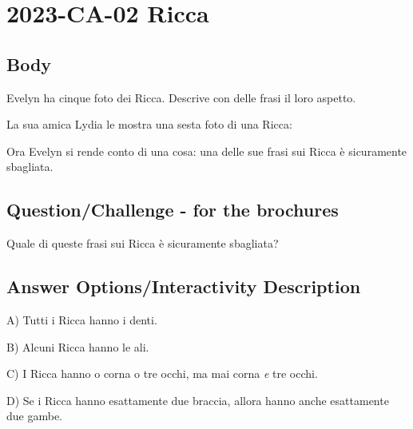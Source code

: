 \documentclass[a4paper,11pt]{report}
\newcommand{\taskGraphicsFolder}{..}
\begin{document}
\section*{\centering{} 2023-CA-02 Ricca}


\subsection*{Body}

Evelyn ha cinque foto dei Ricca. Descrive con delle frasi il loro aspetto.

\raisebox{-0.5ex}{}
\raisebox{-0.5ex}{}
\raisebox{-0.5ex}{}
\raisebox{-0.5ex}{}
\raisebox{-0.5ex}{}

La sua amica Lydia le mostra una sesta foto di una Ricca:

{\centering%
\par}

Ora Evelyn si rende conto di una cosa: una delle sue frasi sui Ricca è sicuramente sbagliata.

{\em


\subsection*{Question/Challenge - for the brochures}

Quale di queste frasi sui Ricca è sicuramente sbagliata?

}

\begingroup
\renewcommand{\arraystretch}{1.5}
\subsection*{Answer Options/Interactivity Description}

A) Tutti i Ricca hanno i denti.

B) Alcuni Ricca hanno le ali.

C) I Ricca hanno o corna o tre occhi, ma mai corna \emph{e} tre occhi.

D) Se i Ricca hanno esattamente due braccia, allora hanno anche esattamente due gambe.
\end{document}
